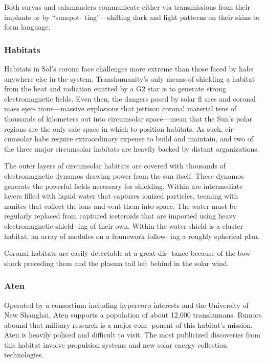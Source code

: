 Both suryas and salamanders communicate either 
via transmissions from their implants or by ``sunspot-
ting''—shifting dark and light patterns on their skins 
to form language.

\subsubsection{Habitats}

Habitats in Sol's corona face challenges more extreme 
than those faced by habs anywhere else in the system. 
Transhumanity's only means of shielding a habitat 
from the heat and radiation emitted by a G2 star is to 
generate strong electromagnetic fields. Even then, the 
dangers posed by solar fl ares and coronal mass ejec-
tions—massive explosions that jettison coronal material 
tens of thousands of kilometers out into circumsolar 
space—mean that the Sun's polar regions are the only 
safe space in which to position habitats. As such, cir-
cumsolar habs require extraordinary expense to build 
and maintain, and two of the three major circumsolar 
habitats are heavily backed by distant organizations.

The outer layers of circumsolar habitats are covered 
with thousands of electromagnetic dynamos drawing 
power from the sun itself. These dynamos generate 
the powerful fields necessary for shielding. Within 
are intermediate layers filled with liquid water that 
captures ionized particles, teeming with nanites that 
collect the ions and vent them into space. The water 
must be regularly replaced from captured iceteroids 
that are imported using heavy electromagnetic shield-
ing of their own. Within the water shield is a cluster 
habitat, an array of modules on a framework follow-
ing a roughly spherical plan.


Coronal habitats are easily detectable at a great dis-
tance because of the bow shock preceding them and 
the plasma tail left behind in the solar wind.

\subsubsection{Aten}

Operated by a consortium including hypercorp 
interests and the University of New Shanghai, Aten 
supports a population of about 12,000 transhumans. 
Rumors abound that military research is a major com-
ponent of this habitat's mission. Aten is heavily policed 
and difficult to visit. The most publicized discoveries 
from this habitat involve propulsion systems and new 
solar energy collection technologies.


